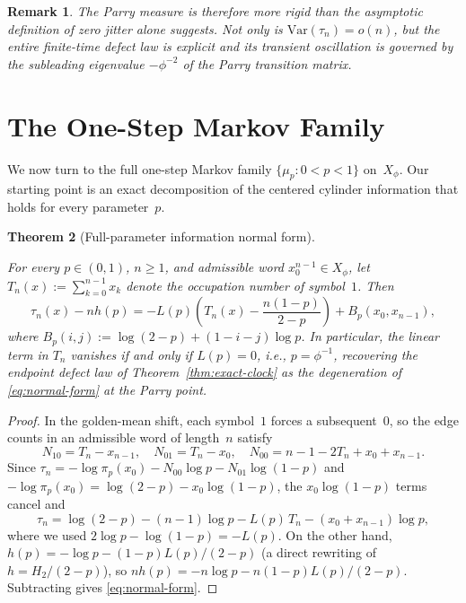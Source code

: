 \documentclass[pdflatex,sn-basic,Numbered]{sn-jnl}
\theoremstyle{thmstyleone}
\newtheorem{theorem}{Theorem}[section]
\theoremstyle{thmstyletwo}
\newtheorem{remark}[theorem]{Remark}
\theoremstyle{thmstylethree}
\newcommand{\Var}{\mathrm{Var}}
\newcommand{\leanverified}[1]{}
\begin{document}
\begin{remark}
The Parry measure is therefore more rigid than the asymptotic definition of zero jitter alone suggests. Not only is $\Var(\tau_n)=o(n)$, but the entire finite-time defect law is explicit and its transient oscillation is governed by the subleading eigenvalue $-\phi^{-2}$ of the Parry transition matrix.
\end{remark}

\section{The One-Step Markov Family}

We now turn to the full one-step Markov family $\{\mu_p : 0<p<1\}$ on~$X_\phi$. Our starting point is an exact decomposition of the centered cylinder information that holds for every parameter~$p$.

\begin{theorem}[Full-parameter information normal form]\label{thm:normal-form}
\leanverified{paper_zero_jitter_normal_form}
For every $p\in(0,1)$, $n\ge 1$, and admissible word $x_0^{n-1}\in X_\phi$, let $T_n(x):=\sum_{k=0}^{n-1}x_k$ denote the occupation number of symbol~$1$. Then
\begin{equation}\label{eq:normal-form}
\tau_n(x) - nh(p) = -L(p)\!\left(T_n(x)-\frac{n(1-p)}{2-p}\right)+B_p(x_0,x_{n-1}),
\end{equation}
where $B_p(i,j):=\log(2-p)+(1-i-j)\log p$. In particular, the linear term in $T_n$ vanishes if and only if $L(p)=0$, i.e., $p=\phi^{-1}$, recovering the endpoint defect law of Theorem~\ref{thm:exact-clock} as the degeneration of \eqref{eq:normal-form} at the Parry point.
\end{theorem}

\begin{proof}
In the golden-mean shift, each symbol~$1$ forces a subsequent~$0$, so the edge counts in an admissible word of length~$n$ satisfy
\[
N_{10}=T_n-x_{n-1},\quad N_{01}=T_n-x_0,\quad N_{00}=n-1-2T_n+x_0+x_{n-1}.
\]
Since $\tau_n=-\log\pi_p(x_0)-N_{00}\log p-N_{01}\log(1-p)$ and $-\log\pi_p(x_0)=\log(2-p)-x_0\log(1-p)$, the $x_0\log(1-p)$ terms cancel and
\[
\tau_n=\log(2-p)-(n-1)\log p-L(p)\,T_n-(x_0+x_{n-1})\log p,
\]
where we used $2\log p-\log(1-p)=-L(p)$. On the other hand, $h(p)=-\log p-(1-p)L(p)/(2-p)$ (a direct rewriting of $h=H_2/(2-p)$), so $nh(p)=-n\log p-n(1-p)L(p)/(2-p)$. Subtracting gives \eqref{eq:normal-form}.
\end{proof}
\end{document}
